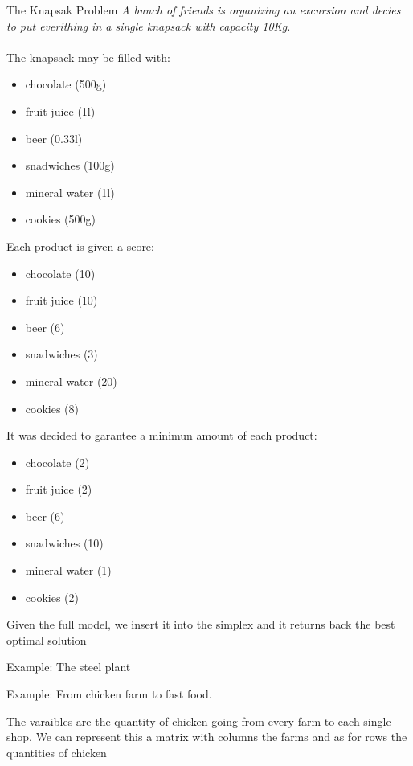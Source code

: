 \documentclass[12pt]{article}
\begin{document}
\begin{example}{The Knapsak Problem}{}
  \textit{A bunch of friends is organizing an excursion and decies to put everithing in a single knapsack with capacity 10Kg.}
  \\ \\
  The knapsack may be filled with:
  \begin{itemize}
    \item chocolate (500g)
    \item fruit juice (1l)
    \item beer (0.33l)
    \item snadwiches (100g)
    \item mineral water (1l)
    \item cookies (500g)
  \end{itemize}
  Each product is given a score:
  \begin{itemize}
    \item chocolate (10)
    \item fruit juice (10)
    \item beer (6)
    \item snadwiches (3)
    \item mineral water (20)
    \item cookies (8)
  \end{itemize}
  It was decided to garantee a minimun amount of each product:
  \begin{itemize}
    \item chocolate (2)
    \item fruit juice (2)
    \item beer (6)
    \item snadwiches (10)
    \item mineral water (1)
    \item cookies (2)
  \end{itemize}
\end{example}


Given the full model, we insert it into the simplex and it returns back the best optimal solution

Example:
The steel plant

Example:
From chicken farm to fast food.

The varaibles are the quantity of chicken going from every farm to each single shop. We can represent this a matrix with columns the farms and as for rows the quantities of chicken
\end{document}
